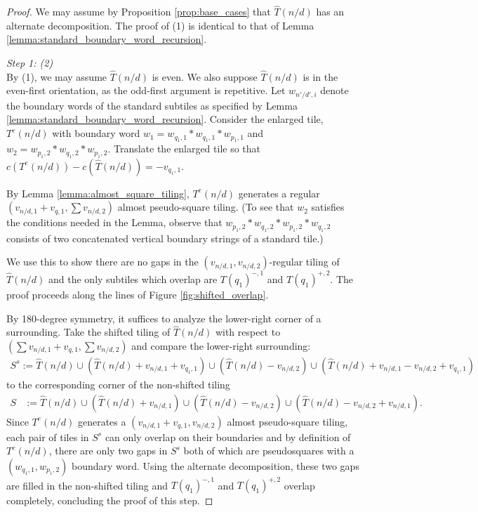 \documentclass[12pt]{amsart}
\begin{document}
\begin{proof}
	We may assume by Proposition \ref{prop:base_cases} that $\hat{T}(n/d)$ has an alternate decomposition. The proof 
	of (1) is identical to that of Lemma \ref{lemma:standard_boundary_word_recursion}. 
	
	{\it Step 1: (2)} \\
	By (1), we may assume $\hat{T}(n/d)$ is even. We also suppose $\hat{T}(n/d)$ is in the even-first orientation, as the odd-first argument is repetitive. Let $w_{n'/d', i}$ denote the boundary words 
	of the standard subtiles as specified by Lemma \ref{lemma:standard_boundary_word_recursion}. 
	Consider the enlarged tile, $T^e(n/d)$ with boundary word $w_1 = w_{q_1,1}*w_{q_1,1}*w_{p_1,1}$
	and $w_2 = w_{p_1,2}*w_{q_1,2}*w_{p_1,2}$. Translate the enlarged tile so that $c(T^e(n/d)) - c(\hat{T}(n/d)) = -v_{q_1,1}$. 
	
	By Lemma \ref{lemma:almost_square_tiling}, $T^e(n/d)$ generates a regular $(v_{n/d,1}+v_{q,1}, \sum v_{n/d,2})$ almost pseudo-square tiling.  (To see that $w_2$ satisfies
	the conditions needed in the Lemma, observe that $w_{p_1,2}*w_{q_1,2}*w_{p_1,2}*w_{q_1,2}$ consists of two concatenated vertical boundary strings of a standard tile.)
	
	We use this to show there are no gaps in the $(v_{n/d,1}, v_{n/d,2})$-regular tiling of $\hat{T}(n/d)$
	and the only subtiles which overlap are $T(q_1)^{-,1}$ and $T(q_1)^{+,2}$.	The proof proceeds along the lines of Figure \ref{fig:shifted_overlap}.
	
 	By 180-degree symmetry, it suffices to analyze the lower-right corner of a surrounding. Take the shifted tiling of $\hat{T}(n/d)$ with respect to  $(\sum v_{n/d,1}+v_{q,1}, \sum v_{n/d,2})$ and compare the lower-right surrounding: 
	\begin{align*}
	S^{s} := \hat{T}(n/d) \cup (\hat{T}(n/d) + v_{n/d,1} + v_{q_1,1}) \cup (\hat{T}(n/d) - v_{n/d,2}) \cup (\hat{T}(n/d) + v_{n/d,1} - v_{n/d,2} + v_{q_1,1})
	\end{align*}
 	to the corresponding corner of the non-shifted tiling
	\begin{align*}
	S &:= \hat{T}(n/d) \cup (\hat{T}(n/d) + v_{n/d,1}) \cup (\hat{T}(n/d) - v_{n/d,2}) \cup (\hat{T}(n/d) -v_{n/d,2} + v_{n/d,1}).
	\end{align*}
	Since $T^e(n/d)$ generates a $(v_{n/d,1}+v_{q,1}, v_{n/d,2})$ almost pseudo-square tiling, each 
	pair of tiles in $S^{s}$ can only overlap on their boundaries and by definition of $T^e(n/d)$, there 
	are only two gaps in $S^{s}$ both of which are pseudosquares with a $(w_{q_1,1}, w_{p_1,2})$ boundary word. 
	Using the alternate decomposition, these two gaps are filled in the non-shifted tiling and $T(q_1)^{-,1}$ and $T(q_1)^{+,2}$ overlap
	completely, concluding the proof of this step. 
	

\end{proof}
\end{document}
